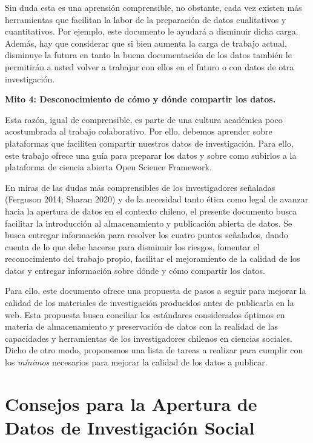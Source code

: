\documentclass[
  spanish,
  letterpaper,
  DIV=11,
  numbers=noendperiod]{scrreprt}
\begin{document}
Sin duda esta es una aprensión comprensible, no obstante, cada vez
existen más herramientas que facilitan la labor de la preparación de
datos cualitativos y cuantitativos. Por ejemplo, este documento le
ayudará a disminuir dicha carga. Además, hay que considerar que si bien
aumenta la carga de trabajo actual, disminuye la futura en tanto la
buena documentación de los datos también le permitirán a usted volver a
trabajar con ellos en el futuro o con datos de otra investigación.

\textbf{Mito 4: Desconocimiento de cómo y dónde compartir los datos.}

Esta razón, igual de comprensible, es parte de una cultura académica
poco acostumbrada al trabajo colaborativo. Por ello, debemos aprender
sobre plataformas que faciliten compartir nuestros datos de
investigación. Para ello, este trabajo ofrece una guía para preparar los
datos y sobre como subirlos a la plataforma de ciencia abierta Open
Science Framework.

En miras de las dudas más comprensibles de los investigadores señaladas
(Ferguson 2014; Sharan 2020) y de la necesidad tanto ética como legal de
avanzar hacia la apertura de datos en el contexto chileno, el presente
documento busca facilitar la introducción al almacenamiento y
publicación abierta de datos. Se busca entregar información para
resolver los cuatro puntos señalados, dando cuenta de lo que debe
hacerse para disminuir los riesgos, fomentar el reconocimiento del
trabajo propio, facilitar el mejoramiento de la calidad de los datos y
entregar información sobre dónde y cómo compartir los datos.

Para ello, este documento ofrece una propuesta de pasos a seguir para
mejorar la calidad de los materiales de investigación producidos antes
de publicarla en la web. Esta propuesta busca conciliar los estándares
considerados óptimos en materia de almacenamiento y preservación de
datos con la realidad de las capacidades y herramientas de los
investigadores chilenos en ciencias sociales. Dicho de otro modo,
proponemos una lista de tareas a realizar para cumplir con los
\emph{mínimos} necesarios para mejorar la calidad de los datos a
publicar.

\section{Consejos para la Apertura de Datos de Investigación
Social}\label{consejos-para-la-apertura-de-datos-de-investigaciuxf3n-social}
\end{document}
